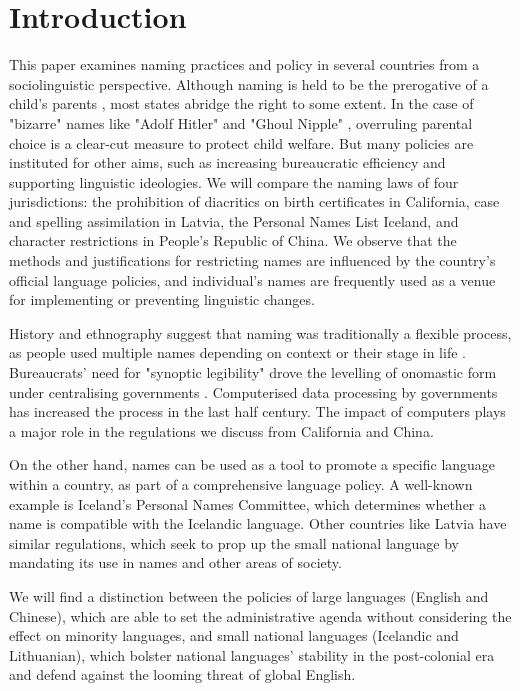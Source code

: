\section{Introduction}

This paper examines naming practices and policy in several countries from a
sociolinguistic perspective. Although naming is held to be the prerogative of a
child's parents \parencite{alford87}, most states abridge the right to some
extent. In the case of "bizarre" names like "Adolf Hitler" and "Ghoul Nipple"
\parencite{larson11}, overruling parental choice is a clear-cut measure to
protect child welfare. But many policies are instituted for other aims, such as
increasing bureaucratic efficiency and supporting linguistic ideologies. We
will compare the naming laws of four jurisdictions: the prohibition of
diacritics on birth certificates in California, case and spelling assimilation
in Latvia, the Personal Names List Iceland, and character restrictions in
People's Republic of China. We observe that the methods and justifications for
restricting names are influenced by the country's official language policies,
and individual's names are frequently used as a venue for implementing or
preventing linguistic changes.

History and ethnography suggest that naming was traditionally a flexible
process, as people used multiple names depending on context or their stage in
life \parencite{alford87} \parencite{scott02}. Bureaucrats' need for "synoptic
legibility" drove the levelling of onomastic form under centralising
governments \parencite{scott02}. Computerised data processing by governments
has increased the process in the last half century. The impact of computers
plays a major role in the regulations we discuss from California and China.

On the other hand, names can be used as a tool to promote a specific language
within a country, as part of a comprehensive language policy. A well-known
example is Iceland's Personal Names Committee, which determines whether a name
is compatible with the Icelandic language. Other countries like Latvia have
similar regulations, which seek to prop up the small national language by
mandating its use in names and other areas of society.

We will find a distinction between the policies of large languages (English and
Chinese), which are able to set the administrative agenda without considering
the effect on minority languages, and small national languages (Icelandic and
Lithuanian), which bolster national languages' stability in the post-colonial
era and defend against the looming threat of global English.

